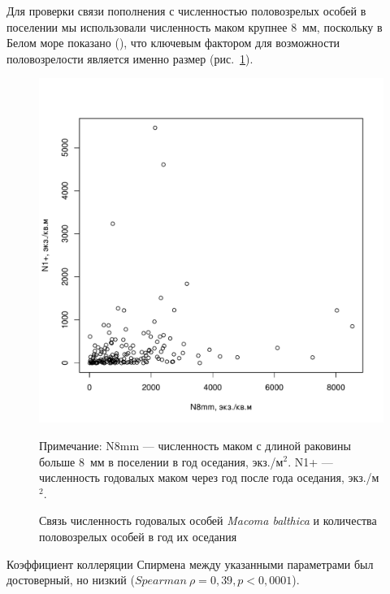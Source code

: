 Для проверки связи пополнения с численностью половозрелых особей в поселении мы использовали численность маком крупнее $8$~мм, поскольку в Белом море показано (\cite{Semenova_1980, Maximovich_1985}), что ключевым фактором для возможности половозрелости является именно размер (рис.~\ref{ris:N1year_vs_N8mm}).
    \begin{figure}[p]
        \includegraphics[width=\textwidth]{../White_Sea/oneyear_all_Kandalaksha_all/N8mm_vs_N1y_1.pdf}
    \caption{Связь численность годовалых особей {\it Macoma balthica} и количества половозрелых особей в год их оседания}
    \label{ris:N1year_vs_N8mm}

	\footnotesize{Примечание: N8mm --- численность маком с длиной раковины больше $8$~мм в поселении  в год оседания, экз./м$^2$. N1+ ---численность годовалых маком через год после года оседания, экз./м$^2$.}
    \end{figure}
Коэффициент коллеряции Спирмена между указанными параметрами был достоверный, но низкий ($Spearman\ \rho = 0,39, p < 0,0001$). 

